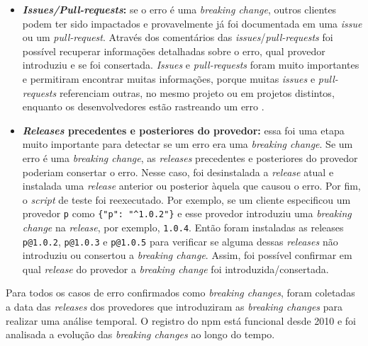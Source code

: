 \begin{itemize}
    \item \textbf{\textit{Issues/Pull-requests}:} se o erro é uma \textit{breaking change}, outros clientes podem ter sido impactados e provavelmente já foi documentada em uma \textit{issue} ou um \textit{pull-request}. Através dos comentários das \textit{issues}/\textit{pull-requests} foi possível recuperar informações detalhadas sobre o erro, qual provedor introduziu e se foi consertada. \textit{Issues} e \textit{pull-requests} foram muito importantes e permitiram encontrar muitas informações, porque muitas \textit{issues} e \textit{pull-requests} referenciam outras, no mesmo projeto ou em projetos distintos, enquanto os desenvolvedores estão rastreando um erro \cite{Zhang:2018:WIL:3242887.3242891}.

    \item \textbf{\textit{Releases} precedentes e posteriores do provedor:} essa foi uma etapa muito importante para detectar se um erro era uma \textit{breaking change}. Se um erro é uma \textit{breaking change}, as \textit{releases} precedentes e posteriores do provedor poderiam consertar o erro. Nesse caso, foi desinstalada a \textit{release} atual e instalada uma \textit{release} anterior ou posterior àquela que causou o erro. Por fim, o \textit{script} de teste foi reexecutado. Por exemplo, se um cliente especificou um provedor \texttt{p} como \texttt{\{"p": "\textasciicircum1.0.2"\}} e esse provedor introduziu uma \textit{breaking change} na \textit{release}, por exemplo, \texttt{1.0.4}. Então foram instaladas as releases \texttt{p@1.0.2}, \texttt{p@1.0.3} e \texttt{p@1.0.5} para verificar se alguma dessas \textit{releases} não introduziu ou consertou a \textit{breaking change}. Assim, foi possível confirmar em qual \textit{release} do provedor a \textit{breaking change} foi introduzida/consertada.
\end{itemize}{}

Para todos os casos de erro confirmados como \textit{breaking changes}, foram coletadas a data das \textit{releases} dos provedores que introduziram as \textit{breaking changes} para realizar uma análise temporal. O registro do \textsf{npm} está funcional desde 2010 e foi analisada a evolução das \textit{breaking changes} ao longo do tempo.

